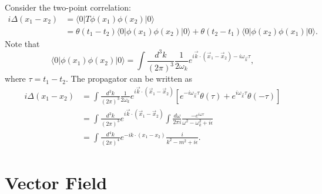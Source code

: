 Consider the two-point correlation:
\begin{equation*}
\begin{aligned}
	i\Delta(x_1-x_2) &= \langle 0|T \phi(x_1) \phi(x_2) |0\rangle \\
	&= \theta(t_1-t_2) \langle 0|\phi(x_1) \phi(x_2) |0\rangle 
	+ \theta(t_2-t_1) \langle 0|\phi(x_2) \phi(x_1) |0\rangle.
\end{aligned}
\end{equation*}
Note that
\begin{equation*}
	\langle 0|\phi(x_1) \phi(x_2) |0\rangle
	= \int\frac{d^{3} k}{(2\pi)^{3}}\frac{1}{2\omega_k} e^{i\vec k\cdot (\vec x_1-\vec x_2)-i\omega_{\vec k}\tau},
\end{equation*}
where $\tau =t_1-t_2$.
The propagator can be written as
\begin{equation*}
\begin{aligned}
	i\Delta(x_1-x_2) 
	&= \int\frac{d^{3} k}{(2\pi)^{3}}\frac{1}{2\omega_k} e^{i\vec k\cdot (\vec x_1-\vec x_2)}\left[e^{-i\omega_{\vec k}\tau}\theta(\tau)+e^{i\omega_{\vec k}\tau}\theta(-\tau)\right] \\
	&= \int\frac{d^{3} k}{(2\pi)^{3}} e^{i\vec k\cdot (\vec x_1-\vec x_2)}\int \frac{d\omega}{2\pi i}\frac{-e^{i\omega\tau}}{\omega^2-\omega_k^2+i\epsilon} \\
	&= \int\frac{d^{4} k}{(2\pi)^{4}} e^{-i k\cdot (x_1-x_2)}\frac{i}{k^2-m^2+i\epsilon}.
\end{aligned}
\end{equation*}



\section{Vector Field}


